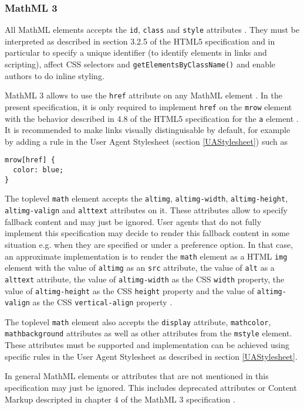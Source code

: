 \subsubsection{MathML 3}

All MathML elements accepts the {\tt id}, {\tt class} and {\tt style} attributes
\cite{MathML3}.
They must be interpreted as described in section 3.2.5 of the
HTML5 specification \cite{HTML5} and in particular to specify a unique
identifier (to identify elements in links and scripting), affect CSS selectors
and {\tt getElementsByClassName()} and enable authors to do inline styling.

MathML 3 allows to use the {\tt href} attribute on any MathML element
\cite{MathML3}. In the present specification, it is only required to implement
{\tt href} on the {\tt mrow} element with the behavior described in 4.8
of the HTML5 specification for the {\tt a} element \cite{HTML5}. It is
recommended to make links visually distinguisable by default, for example by
adding a rule in the User Agent Stylesheet (section \ref{UAStylesheet}) such as
\begin{lstlisting}
mrow[href] {
  color: blue;
}
\end{lstlisting}

The toplevel {\tt math} element accepts the {\tt altimg}, {\tt altimg-width},
{\tt altimg-height}, {\tt altimg-valign} and {\tt alttext} attributes on it.
These attributes allow to specify fallback content and may just be ignored.
User agents that do not fully implement this specification may decide to
render this fallback content in some situation e.g. when they are specified or
under a preference option. In that case, an approximate implementation is to
render the {\tt math} element as a HTML {\tt img} element with the
value of {\tt altimg} as an {\tt src} attribute, the value of
{\tt alt} as a {\tt alttext} attribute, the value of {\tt altimg-width} as
the CSS {\tt width} property, the value of {\tt altimg-height} as
the CSS {\tt height} property and the value of {\tt altimg-valign} as
the CSS {\tt vertical-align} property \cite{HTML5} \cite{CSS2}.

The toplevel {\tt math} element also accepts the {\tt display} attribute,
{\tt mathcolor}, {\tt mathbackground} attributes as well as other attributes
from the {\tt mstyle} element. These attributes must be supported and
implementation can be achieved using specific rules in the User Agent Stylesheet
as described in section \ref{UAStylesheet}.

In general MathML elements or attributes that are not mentioned in this
specification may just be ignored. This includes deprecated attributes or
Content Markup descripted in chapter 4 of the MathML 3 specification
\cite{MathML3}.

